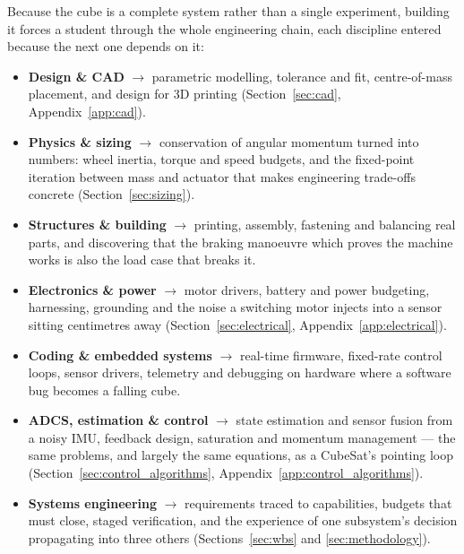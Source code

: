 Because the cube is a complete system rather than a single experiment, building it forces a student through the whole engineering chain, each discipline entered because the next one depends on it:

\begin{itemize}
    \item \textbf{Design \& CAD} $\rightarrow$ parametric modelling, tolerance and fit, centre-of-mass placement, and design for 3D printing (Section~\ref{sec:cad}, Appendix~\ref{app:cad}).
    \item \textbf{Physics \& sizing} $\rightarrow$ conservation of angular momentum turned into numbers: wheel inertia, torque and speed budgets, and the fixed-point iteration between mass and actuator that makes engineering trade-offs concrete (Section~\ref{sec:sizing}).
    \item \textbf{Structures \& building} $\rightarrow$ printing, assembly, fastening and balancing real parts, and discovering that the braking manoeuvre which proves the machine works is also the load case that breaks it.
    \item \textbf{Electronics \& power} $\rightarrow$ motor drivers, battery and power budgeting, harnessing, grounding and the noise a switching motor injects into a sensor sitting centimetres away (Section~\ref{sec:electrical}, Appendix~\ref{app:electrical}).
    \item \textbf{Coding \& embedded systems} $\rightarrow$ real-time firmware, fixed-rate control loops, sensor drivers, telemetry and debugging on hardware where a software bug becomes a falling cube.
    \item \textbf{ADCS, estimation \& control} $\rightarrow$ state estimation and sensor fusion from a noisy IMU, feedback design, saturation and momentum management --- the same problems, and largely the same equations, as a CubeSat's pointing loop (Section~\ref{sec:control_algorithms}, Appendix~\ref{app:control_algorithms}).
    \item \textbf{Systems engineering} $\rightarrow$ requirements traced to capabilities, budgets that must close, staged verification, and the experience of one subsystem's decision propagating into three others (Sections~\ref{sec:wbs} and \ref{sec:methodology}).
\end{itemize}


